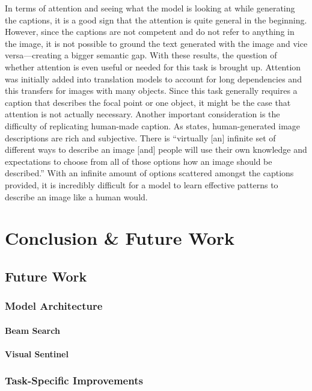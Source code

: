 \documentclass[11pt,a4paper]{article}
\begin{document}
In terms of attention and seeing what the model is looking at while generating the captions, it is a good sign that the attention is quite general in the beginning. However, since the captions are not competent and do not refer to anything in the image, it is not possible to ground the text generated with the image and vice versa—creating a bigger semantic gap. With these results, the question of whether attention is even useful or needed for this task is brought up. Attention was initially added into translation models to account for long dependencies and this transfers for images with many objects. Since this task generally requires a caption that describes the focal point or one object, it might be the case that attention is not actually necessary. Another important consideration is the difficulty of replicating human-made caption. As \citet{miltenburg-pragmatic} states, human-generated image descriptions are rich and subjective. There is “virtually [an] infinite set of different ways to describe an image [and] people will use their own knowledge and expectations to choose from all of those options how an image should be described.” \citep{miltenburg-pragmatic} With an infinite amount of options scattered amongst the captions provided, it is incredibly difficult for a model to learn effective patterns to describe an image like a human would.

\section{Conclusion \& Future Work}
\label{sec:conc&fw}
\subsection{Future Work}
\label{ssec:futurework}

\subsubsection{Model Architecture}
\label{sssec:modarch}
\paragraph{Beam Search}
\paragraph{Visual Sentinel}

\subsubsection{Task-Specific Improvements}
\label{sssec:ds task}
\end{document}
